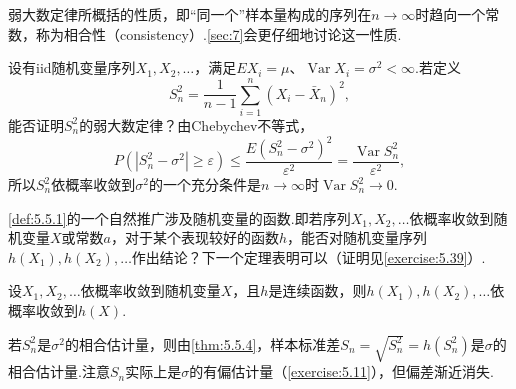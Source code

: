 弱大数定律所概括的性质，即“同一个”样本量构成的序列在$n\to\infty$时趋向一个常数，称为相合性（consistency）.\autoref{sec:7}会更仔细地讨论这一性质.
\begin{example}[$S^2$的相合性]\label{ex:5.5.3}
设有iid随机变量序列$X_1,X_2,\ldots$，满足$EX_i=\mu$、$\operatorname{Var}X_i=\sigma^2<\infty$.若定义
$$S_n^2=\frac1{n-1}\sum_{i=1}^n(X_i-\bar X_n)^2,$$
能否证明$S_n^2$的弱大数定律？由Chebychev不等式，
$$P(|S_n^2-\sigma^2|\ge\varepsilon)\le\frac{E(S_n^2-\sigma^2)^2}{\varepsilon^2}=\frac{\operatorname{Var}S_n^2}{\varepsilon^2},$$
所以$S_n^2$依概率收敛到$\sigma^2$的一个充分条件是$n\to\infty$时$\operatorname{Var}S_n^2\to0$.
\end{example}
\autoref{def:5.5.1}的一个自然推广涉及随机变量的函数.即若序列$X_1,X_2,\ldots$依概率收敛到随机变量$X$或常数$a$，对于某个表现较好的函数$h$，能否对随机变量序列$h(X_1),h(X_2),\ldots$作出结论？下一个定理表明可以（证明见\autoref{exercise:5.39}）.
\begin{theorem}\label{thm:5.5.4}
设$X_1,X_2,\ldots$依概率收敛到随机变量$X$，且$h$是连续函数，则$h(X_1),h(X_2),\ldots$依概率收敛到$h(X)$.
\end{theorem}
\begin{example}[$S$的相合性]\label{ex:5.5.5}
若$S_n^2$是$\sigma^2$的相合估计量，则由\autoref{thm:5.5.4}，样本标准差$S_n=\sqrt{S_n^2}=h(S_n^2)$是$\sigma$的相合估计量.注意$S_n$实际上是$\sigma$的有偏估计量（\autoref{exercise:5.11}），但偏差渐近消失.
\end{example}
